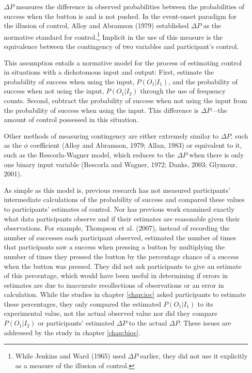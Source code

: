 \documentclass[USenglish,letterpaper,12pt,extrafontsizes,oneside,onecolumn,final]{memoir}
\newcommand{\deltap}{$\Delta P$}
\begin{document}
\deltap \xspace measures the difference in observed probabilities between the probabilities of success when the button is and is not pushed. In the event-onset paradigm for the illusion of control, Alloy and Abramson (1979) established \deltap \xspace as the normative standard for control.\footnote{While Jenkins and Ward (1965) used \deltap \xspace earlier, they did not use it explicitly as a measure of the illusion of control.}  Implicit in the use of this measure is the equivalence between the contingency of two variables and participant's control.  

This assumption entails a normative model for the process of estimating control in situations with a dichotomous input and output:
First, estimate the probability of success when using the input, $P(O_1|I_1)$, and the probability of success when not using the input, $P(O_1|I_2)$ through the use of frequency counts. Second, subtract the probability of success when not using the input from the probability of success when using the input.  This difference is $\Delta P$---the amount of control possessed in this situation.

Other methods of measuring contingency are either extremely similar to \deltap \xspace, such as the $\phi$ coefficient (Alloy and Abramson, 1979; Allan, 1983) or equivalent to it, such as the Rescorla-Wagner model, which reduces to the $\Delta P$ when there is only one binary input variable (Rescorla and Wagner, 1972; Danks, 2003; Glymour, 2001).

As simple as this model is, previous research has not measured participants' intermediate calculations of the probability of success and compared these values to participants' estimates of control.  Nor has previous work examined exactly what data participants observe and if their estimates are reasonable given their observations.  For example, Thompson et al. (2007), instead of recording the number of successes each participant observed, estimated the number of times that participants saw a success when pressing a button by multiplying the number of times they pressed the button by the percentage chance of a success when the button was pressed. They did not ask participants to give an estimate of this percentage, which would have been useful in determining if errors in estimates are due to inaccurate recollections of observations or an error in calculation.  While the studies in chapter \ref{chap:ioc} asked participants to estimate these percentages, they only compared the estimated $P(O_1|I_1)$ to its experimental value, not the actual observed value nor did they compare $P(O_1|I_2)$ or participants' estimated $\Delta P$ to the actual $\Delta P$.  These issues are addressed by the study in chapter \ref{chap:bioc}.
\end{document}
